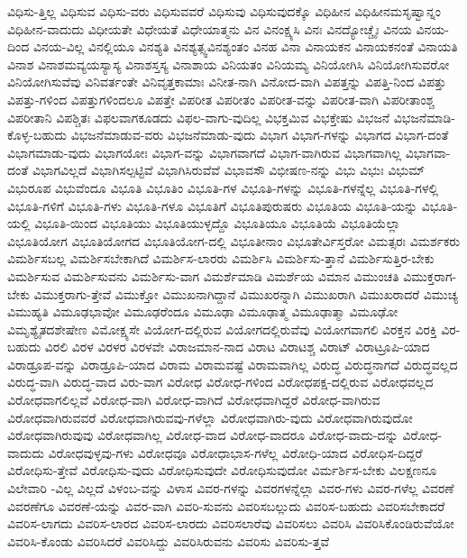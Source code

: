 {ವಿಧಿಸು-ತ್ತಿಲ್ಲ
ವಿಧಿಸುವ
ವಿಧಿಸು-ವರು
ವಿಧಿಸುವವರೆ
ವಿಧಿಸುವು
ವಿಧಿಸುವುದಕ್ಕೊ
ವಿಧಿಹೀನ
ವಿಧಿಹೀನಮಸೃಷ್ವಾನ್ನಂ
ವಿಧಿಹೀನ-ವಾದುದು
ವಿಧೀಯತೇ
ವಿಧೇಯತೆ
ವಿಧೇಯಾತ್ಮನು
ವಿನ
ವಿನಂಕ್ಷ್ಯಸಿ
ವಿನಃ
ವಿನದ್ಯೋಚ್ಚೈಃ
ವಿನಯ
ವಿನಯ-ದಿಂದ
ವಿನಯ-ವಿಲ್ಲ
ವಿನಲ್ಲಿಯೂ
ವಿನಶ್ಯತಿ
ವಿನಶ್ಯತ್ಸ್ವವಿನಶ್ಯಂತಂ
ವಿನಹ
ವಿನಾ
ವಿನಾಯಕನ
ವಿನಾಯಕನಂತೆ
ವಿನಾಯತಿ
ವಿನಾಶ
ವಿನಾಶಮವ್ಯಯಸ್ಯಾಸ್ಯ
ವಿನಾಶಸ್ತಸ್ಯ
ವಿನಾಶಾಯ
ವಿನಿಯತಂ
ವಿನಿಯಮ್ಯ
ವಿನಿಯೋಗಿಸಿ
ವಿನಿಯೋಗಿಸುವರೋ
ವಿನಿಯೋಗಿಸುವೆವು
ವಿನಿವರ್ತಂತೇ
ವಿನಿವೃತ್ತಕಾಮಾಃ
ವಿನೀತ-ನಾಗಿ
ವಿನೋದ-ವಾಗಿ
ವಿಪತ್ತನ್ನು
ವಿಪತ್ತಿ-ನಿಂದ
ವಿಪತ್ತು
ವಿಪತ್ತು-ಗಳಿಂದ
ವಿಪತ್ತುಗಳಿಂದಲೂ
ವಿಪತ್ತೇ
ವಿಪರೀತ
ವಿಪರೀತಂ
ವಿಪರೀತ-ವನ್ನು
ವಿಪರೀತ-ವಾಗಿ
ವಿಪರೀತಾಂಶ್ಚ
ವಿಪರೀತಾನಿ
ವಿಪಶ್ಚಿತಃ
ವಿಫಲವಾಗಕೂಡದು
ವಿಫಲ-ವಾಗು-ವುದಿಲ್ಲ
ವಿಭಕ್ತಮಿವ
ವಿಭಕ್ತೇಷು
ವಿಭಜನೆ
ವಿಭಜನೆಮಾಡಿ-ಕೊಳ್ಳ-ಬಹುದು
ವಿಭಜನೆಮಾಡುವ-ವರು
ವಿಭಜನೆಮಾಡು-ವುದು
ವಿಭಾಗ
ವಿಭಾಗ-ಗಳನ್ನು
ವಿಭಾಗದ
ವಿಭಾಗ-ದಂತೆ
ವಿಭಾಗಮಾಡು-ವುದು
ವಿಭಾಗಯೋಃ
ವಿಭಾಗ-ವನ್ನು
ವಿಭಾಗವಾಗದೆ
ವಿಭಾಗ-ವಾಗಿರುವ
ವಿಭಾಗವಾಗಿಲ್ಲ
ವಿಭಾಗವಾ-ದಂತೆ
ವಿಭಾಗವಿಲ್ಲದೆ
ವಿಭಾಗಿಸಲ್ಪಟ್ಟಿವೆ
ವಿಭಾಗಿಸಿರುವೆವೆ
ವಿಭಾವಸೌ
ವಿಭೀಷಣ-ನನ್ನು
ವಿಭು
ವಿಭುಃ
ವಿಭುಮ್
ವಿಭುರೂಪ
ವಿಭುವೆಂದೂ
ವಿಭೂತಿ
ವಿಭೂತಿಂ
ವಿಭೂತಿ-ಗಳ
ವಿಭೂತಿ-ಗಳನ್ನು
ವಿಭೂತಿ-ಗಳನ್ನೆಲ್ಲ
ವಿಭೂತಿ-ಗಳಲ್ಲಿ
ವಿಭೂತಿ-ಗಳಿಗೆ
ವಿಭೂತಿ-ಗಳು
ವಿಭೂತಿ-ಗಳೂ
ವಿಭೂತಿಗೆ
ವಿಭೂತಿಪುರುಷರು
ವಿಭೂತಿಯ
ವಿಭೂತಿ-ಯನ್ನು
ವಿಭೂತಿ-ಯಲ್ಲಿ
ವಿಭೂತಿ-ಯಿಂದ
ವಿಭೂತಿಯು
ವಿಭೂತಿಯುಳ್ಳದ್ದೊ
ವಿಭೂತಿಯೂ
ವಿಭೂತಿಯೆ
ವಿಭೂತಿಯೆಲ್ಲಾ
ವಿಭೂತಿಯೋಗ
ವಿಭೂತಿಯೋಗದ
ವಿಭೂತಿಯೋಗ-ದಲ್ಲಿ
ವಿಭೂತೀನಾಂ
ವಿಭೂತೇರ್ವಿಸ್ತರೋ
ವಿಮತ್ಸರಃ
ವಿಮರ್ಶಕರು
ವಿಮರ್ಶಿಸಬಲ್ಲ
ವಿಮರ್ಶಿಸಬೇಕಾಗಿದೆ
ವಿಮರ್ಶಿಸ-ಲಾರರು
ವಿಮರ್ಶಿಸಿ
ವಿಮರ್ಶಿಸು-ತ್ತಾನೆ
ವಿಮರ್ಶಿಸುತ್ತಿರ-ಬೇಕು
ವಿಮರ್ಶಿಸುವ
ವಿಮರ್ಶಿಸುವನು
ವಿಮರ್ಶಿಸು-ವಾಗ
ವಿಮರ್ಶೆಮಾಡಿ
ವಿಮರ್ಶೆಯ
ವಿಮಾನ
ವಿಮುಂಚತಿ
ವಿಮುಕ್ತರಾಗ-ಬೇಕು
ವಿಮುಕ್ತರಾಗು-ತ್ತೇವೆ
ವಿಮುಕ್ತೋ
ವಿಮುಖನಾಗಿದ್ದಾನೆ
ವಿಮುಖರನ್ನಾಗಿ
ವಿಮುಖರಾಗಿ
ವಿಮುಖರಾದರೆ
ವಿಮುಚ್ಯ
ವಿಮುಹ್ಯತಿ
ವಿಮೂಢಭಾವೋ
ವಿಮೂಢರೆಂದೂ
ವಿಮೂಢಾ
ವಿಮೂಢಾತ್ಮ
ವಿಮೂಢಾತ್ಮಾ
ವಿಮೂಢೋ
ವಿಮೃಶ್ಯೈತದಶೇಷೇಣ
ವಿಮೋಕ್ಷ್ಯಸೇ
ವಿಯೋಗ-ದಲ್ಲಿರುವ
ವಿಯೋಗದಲ್ಲಿರುವೆವು
ವಿಯೋಗವಾಗಲಿ
ವಿರಕ್ತನ
ವಿರಕ್ತಿ
ವಿರ-ಬಹುದು
ವಿರಲಿ
ವಿರಳ
ವಿರಳರ
ವಿರಳವೇ
ವಿರಾಜಮಾನ-ನಾದ
ವಿರಾಟ
ವಿರಾಟಶ್ಚ
ವಿರಾಟ್
ವಿರಾಟ್ರೂಪಿ-ಯಾದ
ವಿರಾಡ್ರೂಪ-ವನ್ನು
ವಿರಾಡ್ರೂಪಿ-ಯಾದ
ವಿರಾಮ
ವಿರಾಮವಷ್ಟೆ
ವಿರಾಮವಾಗಿಲ್ಲ
ವಿರುದ್ಧ
ವಿರುದ್ಧನಾಗದೆ
ವಿರುದ್ಧವಲ್ಲದ
ವಿರುದ್ಧ-ವಾಗಿ
ವಿರುದ್ಧ-ವಾದ
ವಿರು-ವಾಗ
ವಿರೋಧ
ವಿರೋಧ-ಗಳಿಂದ
ವಿರೋಧಪಕ್ಷ-ದಲ್ಲಿರುವ
ವಿರೋಧವಲ್ಲದ
ವಿರೋಧವಾಗಲಿಲ್ಲವೆ
ವಿರೋಧ-ವಾಗಿ
ವಿರೋಧ-ವಾಗಿದೆ
ವಿರೋಧವಾಗಿದ್ದರೆ
ವಿರೋಧ-ವಾಗಿರುವ
ವಿರೋಧವಾಗಿರುವವರೆ
ವಿರೋಧವಾಗಿರುವವು-ಗಳೆಲ್ಲಾ
ವಿರೋಧವಾಗಿರು-ವುದು
ವಿರೋಧವಾಗಿರುವುದೋ
ವಿರೋಧವಾಗಿರುವುವು
ವಿರೋಧವಾಗಿಲ್ಲ
ವಿರೋಧ-ವಾದ
ವಿರೋಧ-ವಾದರೂ
ವಿರೋಧ-ವಾದು-ದನ್ನು
ವಿರೋಧ-ವಾದುದು
ವಿರೋಧವುಳ್ಳವು-ಗಳು
ವಿರೋಧವೂ
ವಿರೋಧಾಭಾಸ-ಗಳೆಲ್ಲ
ವಿರೋಧಿ-ಯಾದ
ವಿರೋಧಿಸ-ದಿದ್ದರೆ
ವಿರೋಧಿಸು-ತ್ತೇವೆ
ವಿರೋಧಿಸು-ವುದು
ವಿರೋಧಿಸುವುದೇ
ವಿರೋಧಿಸುವುದೋ
ವಿರ್ಮರ್ಶಿಸ-ಬೇಕು
ವಿಲಕ್ಷಣನೂ
ವಿಲೇವಾರಿ
-ವಿಲ್ಲ
ವಿಲ್ಲದೆ
ವಿಳಂಬ-ವನ್ನು
ವಿಳಾಸ
ವಿವರ-ಗಳನ್ನು
ವಿವರಗಳನ್ನೆಲ್ಲಾ
ವಿವರ-ಗಳು
ವಿವರ-ಗಳೆಲ್ಲ
ವಿವರಣೆ
ವಿವರಣೆಗೂ
ವಿವರಣೆ-ಯನ್ನು
ವಿವರ-ವಾಗಿ
ವಿವರಿ-ಸುವನು
ವಿವರಿಸಬಲ್ಲುದು
ವಿವರಿಸ-ಬಹುದು
ವಿವರಿಸಬೇಕಾದರೆ
ವಿವರಿಸ-ಲಾಗದು
ವಿವರಿಸ-ಲಾರದ
ವಿವರಿಸ-ಲಾರದು
ವಿವರಿಸಲಾರೆವು
ವಿವರಿಸಲು
ವಿವರಿಸಿ
ವಿವರಿಸಿಕೊಂಡಿರುವೆಯೋ
ವಿವರಿಸಿ-ಕೊಂಡು
ವಿವರಿಸಿದರೆ
ವಿವರಿಸಿದ್ದು
ವಿವರಿಸಿರುವನು
ವಿವರಿಸು
ವಿವರಿಸು-ತ್ತವೆ
}
